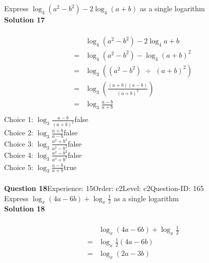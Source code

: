\documentclass{article}
\begin{document}
Express $\log_{4}(a^2-b^2)-2\log_{4}(a+b)$ as a single logarithm\\[4pt]
\noindent\textbf{Solution 17}\\[2pt]
\\[-35pt]\begin{align*}
&\log_{4}(a^2-b^2)-2\log_{4}a+b\\[2pt]
=&\log_{4}(a^2-b^2)-\log_{4}(a+b)^2\\[2pt]
=&\log_{3}((a^2-b^2) \,\, \div \,\, (a+b)^2)\\[2pt]
=&\log_{3}\left(\displaystyle\frac{(a+b)(a-b)}{(a+b)^2}\right)\\[2pt]
=&\log_{3}\displaystyle\frac{a-b}{a+b}\\[-130pt]
\end{align*}
Choice 1: \hspace{20pt}$\log_{3}\displaystyle\frac{a-b}{(a+b)^2}$\hspace{20pt}false\\
Choice 2: \hspace{20pt}$\log_{3}\displaystyle\frac{a+b}{a-b}$\hspace{20pt}false\\
Choice 3: \hspace{20pt}$\log_{3}\displaystyle\frac{a^2+b^2}{a^2-b^2}$\hspace{20pt}false\\
Choice 4: \hspace{20pt}$\log_{3}\displaystyle\frac{a^2-b^2}{a^2+b^2}$\hspace{20pt}false\\
Choice 5: \hspace{20pt}$\log_{3}\displaystyle\frac{a-b}{a+b}$\hspace{20pt}true\\
\\[4pt]
\noindent\textbf{Question 18}\hspace{20pt}Experience: 15\hspace{20pt}Order: c2\hspace{20pt}Level: c2\hspace{20pt}Question-ID: 165\\[2pt]
Express $\log_{x}(4a-6b)+\log_{x}\displaystyle\frac{1}{2}$ as a single logarithm\\[4pt]
\noindent\textbf{Solution 18}\\[2pt]
\\[-35pt]\begin{align*}
&\log_{x}(4a-6b)+\log_{x}\displaystyle\frac{1}{2}\\[2pt]
=&\log_{x}\displaystyle\frac{1}{2}(4a-6b)\\[2pt]
=&\log_{x}(2a-3b)
\end{align*}
\end{document}
